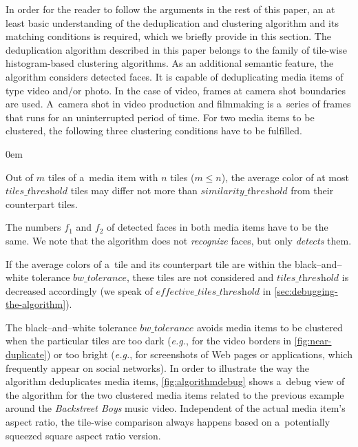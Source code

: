 \documentclass{article}
\begin{document}
In order for the reader to follow the arguments in the rest of this paper,
an at least basic understanding of the deduplication and clustering algorithm
and its matching conditions is required, which we briefly provide in this section.
The deduplication algorithm described in this paper
belongs to the family of tile-wise histogram-based clustering algorithms.
As an additional semantic feature, the algorithm considers detected faces.
It is capable of deduplicating media items of type video and/or photo.
In the case of video, frames at camera shot boundaries are used. %
A~camera shot in video production and filmmaking
is a~series of frames that runs for an uninterrupted period of time.
For two media items to be clustered,
the following three clustering conditions have to be fulfilled.

\begin{description}
  \itemsep0em 
  \item[Cond.~1] Out of $m$ tiles of a~media item with $n$ tiles ($m \leq n$),
    the average color of at most $\textit{tiles\_threshold}$ tiles may differ
    not more than $\textit{similarity\_threshold}$ from their counterpart tiles.
  \item[Cond.~2] The numbers $f_1$ and $f_2$ of detected faces in both media items
    have to be the same.
    We note that the algorithm does not \emph{recognize} faces,
    but only \emph{detects} them.
  \item[Cond.~3] If the average colors of a~tile and its counterpart tile
    are within the black--and--white tolerance $\textit{bw\_tolerance}$,
    these tiles are not considered and $\textit{tiles\_threshold}$
    is decreased accordingly (we speak of $\textit{effective\_tiles\_threshold}$
    in \autoref{sec:debugging-the-algorithm}).
\end{description}

The black--and--white tolerance $\textit{bw\_tolerance}$
avoids media items to be clustered when the particular tiles are too dark
(\emph{e.g.}, for the video borders in \autoref{fig:near-duplicate})
or too bright (\emph{e.g.}, for screenshots of Web pages or applications,
which frequently appear on social networks).
In order to illustrate the way the algorithm deduplicates media items,
\autoref{fig:algorithmdebug} shows a~debug view of the algorithm
for the two clustered media items related to the previous example around the
\emph{Backstreet Boys} music video.
Independent of the actual media item's aspect ratio,
the tile-wise comparison always happens based on a~potentially squeezed
square aspect ratio version.
\end{document}
